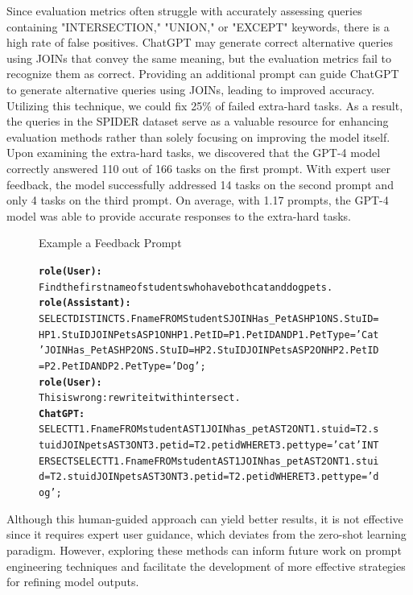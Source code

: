 Since evaluation metrics often struggle with accurately assessing queries containing "INTERSECTION," "UNION," or "EXCEPT" keywords, there is a high rate of false positives. ChatGPT may generate correct alternative queries using JOINs that convey the same meaning, but the evaluation metrics fail to recognize them as correct. Providing an additional prompt can guide ChatGPT to generate alternative queries using JOINs, leading to improved accuracy. Utilizing this technique, we could fix 25\% of failed extra-hard tasks. As a result, the queries in the SPIDER dataset serve as a valuable resource for enhancing evaluation methods rather than solely focusing on improving the model itself.
Upon examining the extra-hard tasks, we discovered that the GPT-4 model correctly answered 110 out of 166 tasks on the first prompt. With expert user feedback, the model successfully addressed 14 tasks on the second prompt and only 4 tasks on the third prompt. On average, with 1.17 prompts, the GPT-4 model was able to provide accurate responses to the extra-hard tasks.

\begin{figure}[H]
    \begin{AIbox}{Example a Feedback Prompt}
        \vspace{-10px}
        \parbox{1\textwidth}{\scriptsize
        \begin{alltt} 
            {\bf role(User):} \\
            Find the first name of students who have both cat and dog pets.
            \\
            {\bf role(Assistant):} \\
            SELECT DISTINCT S.Fname FROM Student S JOIN Has\_Pet AS HP1 ON S.StuID = HP1.StuID JOIN Pets AS P1 ON HP1.PetID = P1.PetID AND P1.PetType = 'Cat' JOIN Has\_Pet AS HP2 ON S.StuID = HP2.StuID JOIN Pets AS P2 ON HP2.PetID = P2.PetID AND P2.PetType = 'Dog';
            \\
            {\bf role(User):} \\
            This is wrong: rewrite it with intersect.
            \\
            {\bf ChatGPT:} \\
            SELECT T1.Fname FROM student AS T1 JOIN has\_pet AS T2 ON T1.stuid  =  T2.stuid JOIN pets AS T3 ON T3.petid  =  T2.petid WHERE T3.pettype  =  'cat' INTERSECT SELECT T1.Fname FROM student AS T1 JOIN has\_pet AS T2 ON T1.stuid  =  T2.stuid JOIN pets AS T3 ON T3.petid  =  T2.petid WHERE T3.pettype  =  'dog';
        \end{alltt}
        }
        \vspace{-10px}
    \end{AIbox}
\end{figure}

Although this human-guided approach can yield better results, it is not effective since it requires expert user guidance, which deviates from the zero-shot learning paradigm. However, exploring these methods can inform future work on prompt engineering techniques and facilitate the development of more effective strategies for refining model outputs.